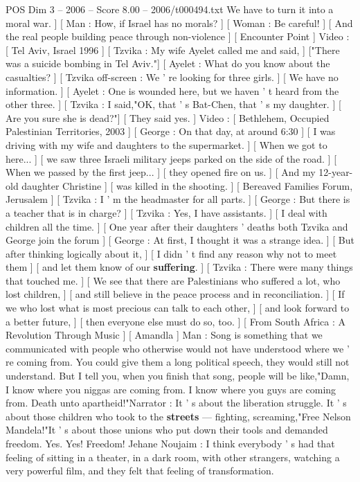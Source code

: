 \begin{textsample}{POS Dim 3 – 2006 – Score 8.00 – 2006/t000494.txt}
We have to turn it into a moral war. ] [ Man : How, if Israel has no morals? ] [ Woman : Be careful! ] [ And the real people building peace through non-violence ] [ Encounter Point ] Video : [ Tel Aviv, Israel 1996 ] [ Tzvika : My wife Ayelet called me and said, ] ["There was a suicide bombing in Tel Aviv."] [ Ayelet : What do you know about the casualties? ] [ Tzvika off-screen : We ' re looking for three girls. ] [ We have no information. ] [ Ayelet : One is wounded here, but we haven ' t heard from the other three. ] [ Tzvika : I said,"OK, that ' s Bat-Chen, that ' s my daughter. ] [ Are you sure she is dead?"] [ They said yes. ] Video : [ Bethlehem, Occupied Palestinian Territories, 2003 ] [ George : On that day, at around 6:30 ] [ I was driving with my wife and daughters to the supermarket. ] [ When we got to here... ] [ we saw three Israeli military jeeps parked on the side of the road. ] [ When we passed by the first jeep... ] [ they opened fire on us. ] [ And my 12-year-old daughter Christine ] [ was killed in the shooting. ] [ Bereaved Families Forum, Jerusalem ] [ Tzvika : I ' m the headmaster for all parts. ] [ George : But there is a teacher that is in charge? ] [ Tzvika : Yes, I have assistants. ] [ I deal with children all the time. ] [ One year after their daughters ' deaths both Tzvika and George join the forum ] [ George : At first, I thought it was a strange idea. ] [ But after thinking logically about it, ] [ I didn ' t find any reason why not to meet them ] [ and let them know of our \textbf{suffering}. ] [ Tzvika : There were many things that touched me. ] [ We see that there are Palestinians who suffered a lot, who lost children, ] [ and still believe in the peace process and in reconciliation. ] [ If we who lost what is most precious can talk to each other, ] [ and look forward to a better future, ] [ then everyone else must do so, too. ] [ From South Africa : A Revolution Through Music ] [ Amandla ] Man : Song is something that we communicated with people who otherwise would not have understood where we ' re coming from.
You could give them a long political speech, they would still not understand.
But I tell you, when you finish that song, people will be like,"Damn, I know where you niggas are coming from.
I know where you guys are coming from.
Death unto apartheid!"Narrator : It ' s about the liberation struggle.
It ' s about those children who took to the \textbf{streets} — fighting, screaming,"Free Nelson Mandela!"It ' s about those unions who put down their tools and demanded freedom.
Yes.
Yes!
Freedom!
Jehane Noujaim : I think everybody ' s had that feeling of sitting in a theater, in a dark room, with other strangers, watching a very powerful film, and they felt that feeling of transformation.

\end{textsample}

